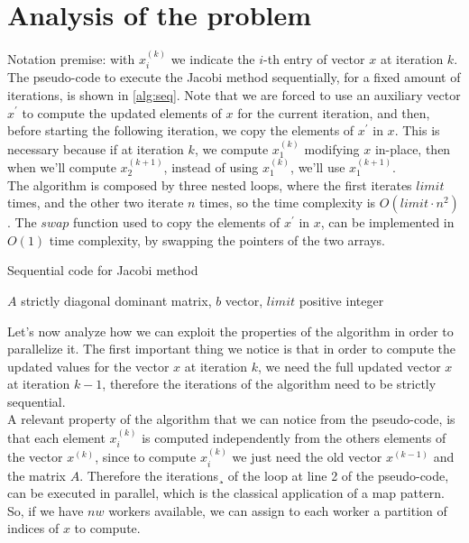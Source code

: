 \documentclass[12pt]{article}
\begin{document}
	\section{Analysis of the problem}
	Notation premise: with $x_i^{(k)}$ we indicate the $i$-th entry of vector $x$ at iteration $k$. The pseudo-code to execute the Jacobi method sequentially, for a fixed amount of iterations, is shown in \ref{alg:seq}. Note that we are forced to use an auxiliary vector $x^\prime$ to compute the updated elements of $x$ for the current iteration, and then, before starting the following iteration, we copy the elements of $x^\prime$ in $x$. This is necessary because if at iteration $k$, we compute $x^{(k)}_1$ modifying $x$ in-place, then when we'll compute $x^{(k+1)}_2$, instead of using $x^{(k)}_1$, we'll use $x^{(k+1)}_1$.\\
	The algorithm is composed by three nested loops, where the first iterates $limit$ times, and the other two iterate $n$ times, so the time complexity is $O(limit\cdot n^2)$. The $swap$ function used to copy the elements of $x^\prime$ in $x$, can be implemented in $O(1)$ time complexity, by swapping the pointers of the two arrays.
	\begin{algorithm}[H]
		\caption{Sequential code for Jacobi method}\label{alg:seq}
		\begin{algorithmic}[1]
			\Require $A$ strictly diagonal dominant matrix, $b$ vector, $limit$ positive integer
			\EndIf
			\EndFor
			\EndFor
			\EndFor
		\end{algorithmic}
	\end{algorithm}
	\noindent Let's now analyze how we can exploit the properties of the algorithm in order to parallelize it. The first important thing we notice is that in order to compute the updated values for the vector $x$ at iteration $k$, we need the full updated vector $x$ at iteration $k-1$, therefore the iterations of the algorithm need to be strictly sequential.\\
	A relevant property of the algorithm that we can notice from the pseudo-code, is that each element $x_i^{(k)}$ is computed independently from the others elements of the vector $x^{(k)}$, since to compute $x_i^{(k)}$ we just need the old vector $x^{(k-1)}$ and the matrix $A$. Therefore the iterations¸ of the loop at line 2 of the pseudo-code, can be executed in parallel, which is the classical application of a map pattern. So, if we have $nw$ workers available, we can assign to each worker a partition of indices of $x$ to compute.\\
\end{document}
